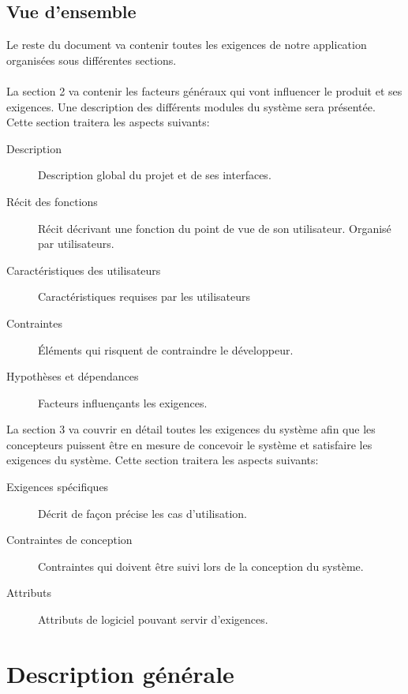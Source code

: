 \documentclass{scrreprt}
\begin{document}
\section{Vue d'ensemble}
Le  reste du document va contenir toutes les exigences de notre application organisées sous différentes sections.
\\
\\
La section 2 va contenir les facteurs généraux qui vont influencer le produit et ses exigences. Une description des différents modules du système sera présentée. Cette section traitera les aspects suivants:
\begin{description}
\item[Description] Description global du projet et de ses interfaces.
\item[Récit des fonctions] Récit décrivant une fonction du point de vue de son utilisateur. Organisé par utilisateurs.
\item[Caractéristiques des utilisateurs] Caractéristiques requises par les utilisateurs
\item[Contraintes] Éléments qui risquent de contraindre le développeur.
\item[Hypothèses et dépendances] Facteurs influençants les exigences.
\end{description}

La section 3 va couvrir en détail toutes les exigences du système afin que les concepteurs puissent être en mesure de concevoir le système et satisfaire les exigences du système. Cette section traitera les aspects suivants:

\begin{description}
\item[Exigences spécifiques] Décrit de façon précise les cas d'utilisation.
\item[Contraintes de conception] Contraintes qui doivent être suivi lors de la conception du système.
\item[Attributs] Attributs de logiciel pouvant servir d'exigences. 
\end{description}
\chapter{Description générale}
\end{document}
